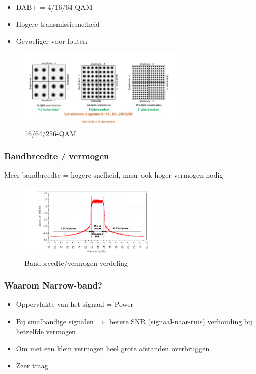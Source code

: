 \documentclass{article}
\begin{document}
\begin{itemize}
    \item DAB+ = 4/16/64-QAM
    \item Hogere transmissiesnelheid
    \item Gevoeliger voor fouten
\end{itemize}

\begin{figure}[H]
    \centering
    \includegraphics[width=0.7\textwidth]{Screenshot_20200302_123030.png}
    \caption{16/64/256-QAM}
\end{figure}

\subsubsection{Bandbreedte / vermogen}
Meer bandbreedte = hogere snelheid, maar ook hoger vermogen nodig


\begin{figure}[H]
    \centering
    \includegraphics[width=0.6\textwidth]{Screenshot_20200302_122703.png}
    \caption{Bandbreedte/vermogen verdeling}
\end{figure}


\subsubsection{Waarom Narrow-band?}
\begin{itemize}
    \item Oppervlakte van het signaal = Power
    \item Bij smalbandige signalen $\Rightarrow$ betere SNR (signaal-naar-ruis) verhouding bij hetzelfde vermogen
    \item Om met een klein vermogen heel grote afstanden overbruggen
    \item Zeer traag
\end{itemize}
\end{document}
